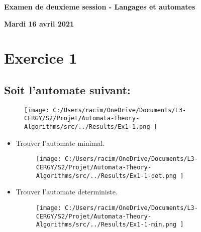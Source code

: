 \documentclass{article}%
\begin{document}
%
\normalsize%
\pagestyle{header}%
\begin{minipage}{\textwidth}%
\centering%
\begin{Large}%
\textbf{Examen de deuxieme session {-} Langages et automates}%
\end{Large}%
\linebreak%
\begin{large}%
\textbf{Mardi 16 avril 2021}%
\end{large}%
\end{minipage}%
\section{Exercice 1}%
\label{sec:Exercice1}%
\subsection{Soit l'automate suivant:}%
\label{subsec:Soitlautomatesuivant}%


\begin{figure}[h!]%
\centering%
\texttt{[image: C:/Users/racim/OneDrive/Documents/L3-CERGY/S2/Projet/Automata-Theory-Algorithms/src/../Results/Ex1-1.png ]}%
\end{figure}

%
\begin{itemize}%
\item%
Trouver l'automate minimal.%


\begin{figure}[h!]%
\centering%
\texttt{[image: C:/Users/racim/OneDrive/Documents/L3-CERGY/S2/Projet/Automata-Theory-Algorithms/src/../Results/Ex1-1-det.png ]}%
\end{figure}

%
\item%
Trouver l'automate deterministe.%


\begin{figure}[h!]%
\centering%
\texttt{[image: C:/Users/racim/OneDrive/Documents/L3-CERGY/S2/Projet/Automata-Theory-Algorithms/src/../Results/Ex1-1-min.png ]}%
\end{figure}

%
\end{itemize}

%
\end{document}
